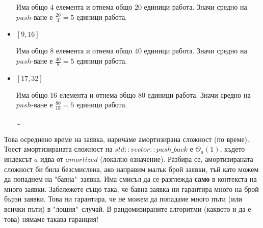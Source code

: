 \begin{examplecp}
\begin{itemize}
		Има общо $4$ елемента и отнема общо $20$ единици работа. Значи средно на $push$-ване е $\frac{20}4=5$ единици работа.
		
		\item $[9,16]$
		
		Има общо $8$ елемента и отнема общо $40$ единици работа. Значи средно на $push$-ване е $\frac{40}8=5$ единици работа.
		
		\item $[17,32]$
		
		Има общо $16$ елемента и отнема общо $80$ единици работа. Значи средно на $push$-ване е $\frac{80}{16}=5$ единици работа.
		
		\begin{center}
			\dots
		\end{center}
	\end{itemize}
	
	\noindent
	Това осреднено време на заявка, наричаме амортизирана сложност (по време). Тоест амортизираната сложност на $std::vector::push\_back$ е $\Theta_{a}(1)$, където индексът $a$ идва от $amortized$ (локално означение). Разбира се, амортизираната сложност би била безсмислена, ако направим малък брой заявки, тъй като можем да попаднем на "бавна"\ заявка. Има смисъл да се разглежда \textbf{само} в контекста на много заявки. Забележете също така, че бавна заявка ни гарантира много на брой бързи заявки. Това ни гарантира, че не можем да попадаме много пъти (или всички пъти) в "лошия"\ случай. В рандомизираните алгоритми (каквото и да е това) нямаме такава гаранция!
\end{examplecp}
